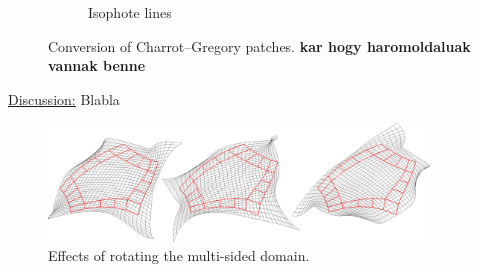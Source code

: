 \documentclass{article}
\begin{document}
\begin{figure}[h!]
\begin{subfigure}{0.23\textwidth}
    \caption{Isophote lines}
  \end{subfigure}
  \caption{Conversion of Charrot--Gregory patches. \bf kar hogy haromoldaluak vannak benne}
\end{figure}

\vspace{10pt}
\noindent\underline{Discussion:}\vspace{0.2em}\newline
Blabla
\begin{figure}[h!]
  \label{fig:rotations}
  \centering
  \includegraphics[width = 0.9\textwidth]{images/rotations.png}
  \caption{Effects of rotating the multi-sided domain.}
\end{figure}
\end{document}
